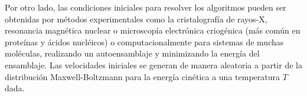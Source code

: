 Por otro lado, las condiciones iniciales para resolver los algoritmos pueden ser obtenidas por m\'{e}todos experimentales como la cristalograf\'{i}a de rayos-X, resonancia magn\'{e}tica nuclear o microscop\'{i}a electr\'{o}nica criog\'{e}nica (m\'{a}s com\'{u}n en prote\'{i}nas y \'{a}cidos nucl\'{e}icos) o computacionalmente para sistemas de muchas mol\'{e}culas, realizando un autoensamblaje y minimizando la energ\'{i}a del ensamblaje. Las velocidades iniciales se generan de manera aleatoria a partir de la distribuci\'{o}n Maxwell-Boltzmann para la energ\'{i}a cin\'{e}tica a una temperatura $T$ dada.\\

